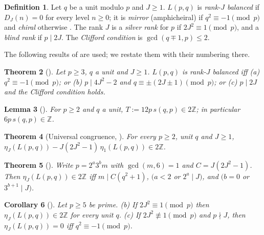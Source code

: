 \documentclass[11pt]{article}
\newtheorem{theorem}{Theorem}[section]
\newtheorem{lemma}[theorem]{Lemma}
\newtheorem{corollary}[theorem]{Corollary}
\theoremstyle{definition}
\newtheorem{definition}[theorem]{Definition}
\newcommand{\Z}{\mathbb Z}
\begin{document}
\begin{definition}
\label{def:terms}
Let $q$ be a unit modulo $p$ and $J\geq1$.  $L(p,q)$ is \emph{rank-$J$
balanced} if $D_J(n)=0$ for every level $n\geq0$; it is \emph{mirror}
(amphicheiral) if $q^2\equiv-1\pmod p$ and \emph{chiral} otherwise
\cite{PrzytyckiYasuhara2003,Boldt2017}.  The rank $J$ is a \emph{silver
rank} for $p$ if $2J^2\equiv1\pmod p$, and a \emph{blind rank} if
$p\mid2J$.  The \emph{Clifford condition} is $\gcd(q\mp1,p)\leq2$.
\end{definition}

The following results of \cite{LensChirality2026} are used; we restate
them with their numbering there.

\begin{theorem}[{\cite[Thm.~4.1]{LensChirality2026}}]
\label{thm:classification}
Let $p\geq3$, $q$ a unit and $J\geq1$.  $L(p,q)$ is rank-$J$ balanced iff
\textup{(a)} $q^2\equiv-1\pmod p$; or \textup{(b)} $p\mid4J^2-2$ and
$q\equiv\pm(2J\pm1)\pmod p$; or \textup{(c)} $p\mid2J$ and the Clifford
condition holds.
\end{theorem}

\begin{lemma}[{\cite[Lem.~6.2]{LensChirality2026}}]
\label{lem:dedekind-facts}
For $p\geq2$ and $q$ a unit, $T:=12p\,s(q,p)\in2\Z$; in particular
$6p\,s(q,p)\in\Z$.
\end{lemma}

\begin{theorem}[{Universal congruence, \cite[Thm.~6.7]{LensChirality2026}}]
\label{thm:U}
For every $p\geq2$, unit $q$ and $J\geq1$,
$\eta_J(L(p,q))-J(2J^2-1)\,\eta_1(L(p,q))\in2\Z$.
\end{theorem}

\begin{theorem}[{\cite[Thm.~6.8(c)]{LensChirality2026}}]
\label{thm:denominator}
Write $p=2^a3^bm$ with $\gcd(m,6)=1$ and $C=J(2J^2-1)$.  Then
$\eta_J(L(p,q))\in2\Z$ iff $m\mid C(q^2+1)$, $(a<2$ or $2^a\mid J)$, and
$(b=0$ or $3^{b+1}\mid J)$.
\end{theorem}

\begin{corollary}[{\cite[Cor.~6.4]{LensChirality2026}}]
\label{cor:E}
Let $p\geq5$ be prime.  \textup{(b)} If $2J^2\equiv1\pmod p$ then
$\eta_J(L(p,q))\in2\Z$ for every unit $q$.  \textup{(c)} If
$2J^2\not\equiv1\pmod p$ and $p\nmid J$, then $\eta_J(L(p,q))=0$ iff
$q^2\equiv-1\pmod p$.
\end{corollary}
\end{document}
